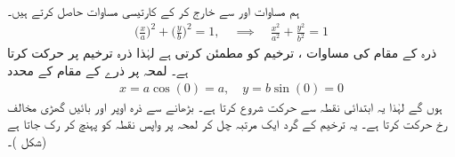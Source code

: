 ہم مساوات  اور  سے  خارج کر کے کارتیسی مساوات حاصل کرتے ہیں۔
\begin{align*}
\big(\frac{x}{a}\big)^2+\big(\frac{y}{b}\big)^2=1,\quad \implies\quad \frac{x^2}{a^2}+\frac{y^2}{b^2}=1
\end{align*}
ذرہ  کے مقام  کی مساوات ، ترخیم  کو مطمئن کرتی ہے لہٰذا  ذرہ ترخیم پر حرکت کرتا ہے۔ لمحہ  پر ذرے کے مقام کے محدد
\begin{align*}
x=a\cos (0)=a,\quad y=b\sin(0)=0
\end{align*}
ہوں گے لہٰذا یہ ابتدائی نقطہ  سے حرکت شروع کرتا ہے۔  بڑھانے سے ذرہ اوپر اور بائیں گھڑی مخالف  رخ حرکت کرتا ہے۔ یہ ترخیم  کے گرد ایک مرتبہ چل کر لمحہ  پر واپس نقطہ  کو  پہنچ کر رک جاتا ہے (شکل )۔ 
